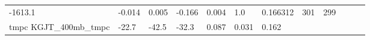 \documentclass[11pt]{article}
\begin{document}
\begin{longtable}[]{@{}llllllllllll@{}}
\begin{minipage}[t]{0.04\columnwidth}
-1613.1\strut
\end{minipage} & \begin{minipage}[t]{0.04\columnwidth}\raggedright\strut
-0.014\strut
\end{minipage} & \begin{minipage}[t]{0.05\columnwidth}\raggedright\strut
0.005\strut
\end{minipage} & \begin{minipage}[t]{0.04\columnwidth}\raggedright\strut
-0.166\strut
\end{minipage} & \begin{minipage}[t]{0.04\columnwidth}\raggedright\strut
0.004\strut
\end{minipage} & \begin{minipage}[t]{0.05\columnwidth}\raggedright\strut
1.0\strut
\end{minipage} & \begin{minipage}[t]{0.05\columnwidth}\raggedright\strut
0.166312\strut
\end{minipage} & \begin{minipage}[t]{0.05\columnwidth}\raggedright\strut
301\strut
\end{minipage} & \begin{minipage}[t]{0.07\columnwidth}\raggedright\strut
299\strut
\end{minipage}\tabularnewline
\begin{minipage}[t]{0.18\columnwidth}\raggedright\strut
tmpc KGJT\_400mb\_tmpc\strut
\end{minipage} & \begin{minipage}[t]{0.04\columnwidth}\raggedright\strut
-22.7\strut
\end{minipage} & \begin{minipage}[t]{0.04\columnwidth}\raggedright\strut
-42.5\strut
\end{minipage} & \begin{minipage}[t]{0.04\columnwidth}\raggedright\strut
-32.3\strut
\end{minipage} & \begin{minipage}[t]{0.04\columnwidth}\raggedright\strut
0.087\strut
\end{minipage} & \begin{minipage}[t]{0.05\columnwidth}\raggedright\strut
0.031\strut
\end{minipage} & \begin{minipage}[t]{0.04\columnwidth}\raggedright\strut
0.162\strut
\end{minipage} & \begin{minipage}[t]{0.04\columnwidth}\raggedright\strut

\end{minipage}
\end{longtable}
\end{document}
